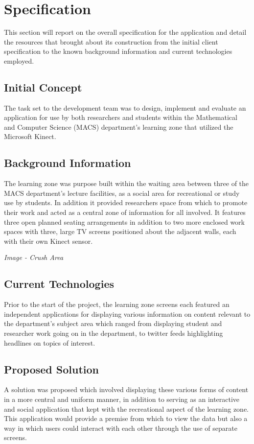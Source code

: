 \documentclass[a4paper,11pt]{article}
\begin{document}
\section{Specification}
This section will report on the overall specification for the application and detail the resources that brought about its construction from the initial client specification to the known background information and current technologies employed. 

\subsection{Initial Concept}
The task set to the development team was to design, implement and evaluate an application for use by both researchers and students within the Mathematical and Computer Science (MACS) department's learning zone that utilized the Microsoft Kinect.

\subsection{Background Information}
The learning zone was purpose built within the waiting area between three of the MACS department's lecture facilities, as a social area for recreational or study use by students. In addition it provided researchers space from which to promote their work and acted as a central zone of information for all involved. It features three open planned seating arrangements in addition to two more enclosed work spaces with three, large TV screens positioned about the adjacent walls, each with their own Kinect sensor. 

\begin{center}
\textit{Image - Crush Area}
\end{center}

\subsection{Current Technologies}
Prior to the start of the project, the learning zone screens each featured an independent applications for displaying various information on content relevant to the department's subject area which ranged from displaying student and researcher work going on in the department, to twitter feeds highlighting headlines on topics of interest.

\subsection{Proposed Solution} 
A solution was proposed which involved displaying these various forms of content in a more central and uniform manner, in addition to serving as an interactive and social application that kept with the recreational aspect of the learning zone. This application would provide a premise from which to view the data but also a way in which users could interact with each other through the use of separate screens.
\end{document}
